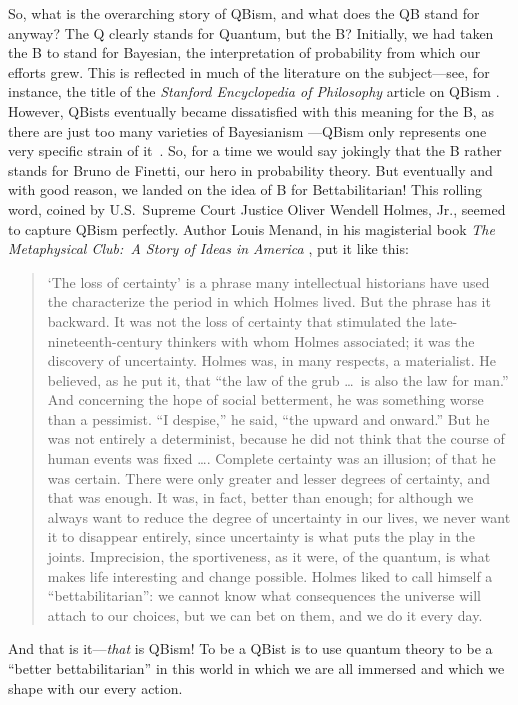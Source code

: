 \documentclass[aps,pra,superscriptaddress,10pt,tightenlines,twocolumn,nofootinbib]{revtex4}
\begin{document}
So, what is the overarching story of QBism, and what does the QB stand for anyway? The Q clearly stands for Quantum, but the B\@? Initially, we had taken the B to stand for Bayesian, the interpretation of probability from which our efforts grew.  This is reflected in much of the literature on the subject---see, for instance, the title of the {\sl Stanford Encyclopedia of Philosophy\/} article on QBism \cite{sep-quantum-bayesian}. However, QBists eventually became dissatisfied with this meaning for the B, as there are just too many varieties of Bayesianism \cite{Good83}---QBism only represents one very specific strain of it~\cite{stacey-vonneumann}.  So, for a time we would say jokingly that the B rather stands for Bruno de Finetti, our hero in probability theory.  But eventually and with good reason, we landed on the idea of B for Bettabilitarian! This rolling word, coined by U.S.\ Supreme Court Justice Oliver Wendell Holmes, Jr., seemed to capture QBism perfectly.  Author Louis Menand, in his magisterial book {\sl The Metaphysical Club:\ A Story of Ideas in America} \cite{Menand01}, put it like this:
\begin{quote}
`The loss of certainty' is a phrase many intellectual historians have used the characterize the period in which Holmes lived. But the phrase has it backward. It was not the loss of certainty that stimulated the late-nineteenth-century thinkers with whom Holmes associated; it was the discovery of uncertainty. Holmes was, in many respects, a materialist. He believed, as he put it, that ``the law of the grub \ldots\ is also the law for man.''  And concerning the hope of social betterment, he was something worse than a pessimist. ``I despise,'' he said, ``the upward and onward.'' But he was not entirely a determinist, because he did not think that the course of human events was fixed \ldots. Complete certainty was an illusion; of that he was certain. There were only greater and lesser degrees of certainty, and that was enough.  It was, in fact, better than enough; for although we always want to reduce the degree of uncertainty in our lives, we never want it to disappear entirely, since uncertainty is what puts the play in the joints.  Imprecision, the sportiveness, as it were, of the quantum, is what makes life interesting and change possible. Holmes liked to call himself a ``bettabilitarian'':  we cannot know what consequences the universe will attach to our choices, but we can bet on them, and we do it every day.
\end{quote}
And that is it---{\it that\/} is QBism!  To be a QBist is to use quantum theory to be a ``better bettabilitarian'' in this world in which we are all immersed and which we shape with our every action.
\end{document}
